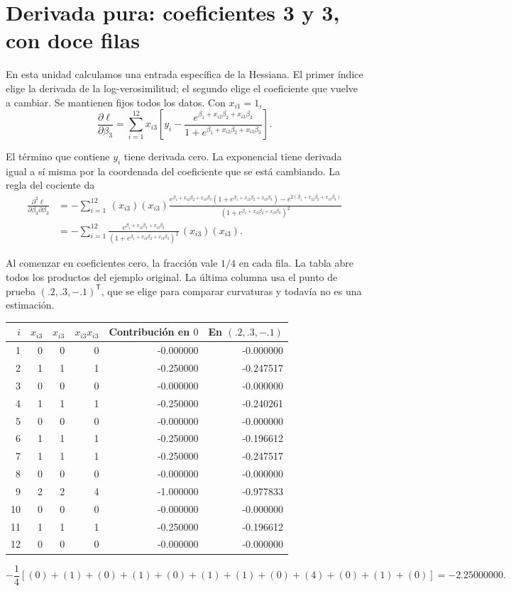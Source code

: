 \documentclass[11pt,a4paper]{article}
\begin{document}
\clearpage
\section{Derivada pura: coeficientes 3 y 3, con doce filas}\label{logit27}
En esta unidad calculamos una entrada específica de la Hessiana.
El primer índice elige la derivada de la log-verosimilitud; el segundo
elige el coeficiente que vuelve a cambiar.
Se mantienen fijos todos los datos. Con $x_{i1}=1$,
\[
\frac{\partial\ell}{\partial\beta_3}=\sum_{i=1}^{12}x_{i3}\left[y_i-\frac{e^{\beta_1+x_{i2}\beta_2+x_{i3}\beta_3}}{1+e^{\beta_1+x_{i2}\beta_2+x_{i3}\beta_3}}\right].
\]

El término que contiene $y_i$ tiene derivada cero.
La exponencial tiene derivada igual a sí misma por la coordenada
del coeficiente que se está cambiando. La regla del cociente da
\[
\begin{aligned}
\frac{\partial^2\ell}{\partial\beta_3\partial\beta_3}&=-\sum_{i=1}^{12}\,(x_{i3})(x_{i3})\frac{e^{\beta_1+x_{i2}\beta_2+x_{i3}\beta_3}(1+e^{\beta_1+x_{i2}\beta_2+x_{i3}\beta_3})-e^{2(\beta_1+x_{i2}\beta_2+x_{i3}\beta_3)}}{(1+e^{\beta_1+x_{i2}\beta_2+x_{i3}\beta_3})^2}\\&=-\sum_{i=1}^{12}\frac{e^{\beta_1+x_{i2}\beta_2+x_{i3}\beta_3}}{(1+e^{\beta_1+x_{i2}\beta_2+x_{i3}\beta_3})^2}\,(x_{i3})(x_{i3}).\end{aligned}
\]

Al comenzar en coeficientes cero, la fracción vale $1/4$ en cada fila.
La tabla abre todos los productos del ejemplo original. La última
columna usa el punto de prueba $(.2,.3,-.1)^\mathsf T$, que se elige
para comparar curvaturas y todavía no es una estimación.
\begin{center}\small
\begin{tabular}{rrrrrr}
\toprule
$i$&$x_{i3}$&$x_{i3}$&$x_{i3}x_{i3}$&Contribución en $0$&En $(.2,.3,-.1)$\\\midrule1&0&0&0&-0.000000&-0.000000\\
2&1&1&1&-0.250000&-0.247517\\
3&0&0&0&-0.000000&-0.000000\\
4&1&1&1&-0.250000&-0.240261\\
5&0&0&0&-0.000000&-0.000000\\
6&1&1&1&-0.250000&-0.196612\\
7&1&1&1&-0.250000&-0.247517\\
8&0&0&0&-0.000000&-0.000000\\
9&2&2&4&-1.000000&-0.977833\\
10&0&0&0&-0.000000&-0.000000\\
11&1&1&1&-0.250000&-0.196612\\
12&0&0&0&-0.000000&-0.000000\\\bottomrule\end{tabular}\end{center}\[
-\frac14\left[(0)+(1)+(0)+(1)+(0)+(1)+(1)+(0)+(4)+(0)+(1)+(0)\right]=-2.25000000.
\]
\end{document}
